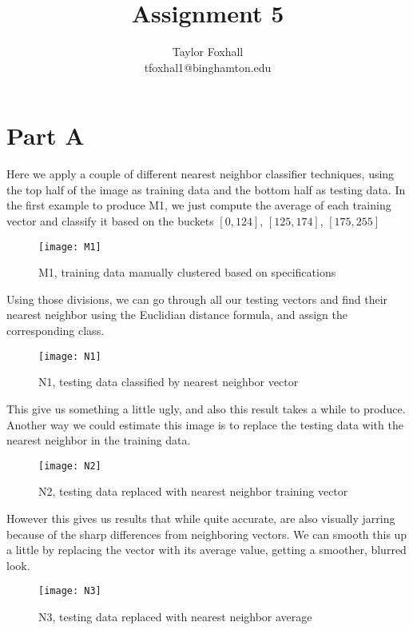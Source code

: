 \documentclass[12pt]{article}
\begin{document}
 
\title{Assignment 5}
\author{Taylor Foxhall\\
tfoxhal1@binghamton.edu}
 
\maketitle

\section{Part A}

Here we apply a couple of different nearest neighbor classifier techniques,
using the top half of the image as training data and the bottom half as testing
data. In the first example to produce M1, we just compute the average of each
training vector and classify it based on the buckets $[0, 124]$, $[125, 174]$, $[175, 255]$

\begin{figure}[H]
  \centering
  \texttt{[image: M1]}
  \caption{M1, training data manually clustered based on specifications}
\end{figure}

Using those divisions, we can go through all our testing vectors and find their
nearest neighbor using the Euclidian distance formula, and assign the
corresponding class.

\begin{figure}[H]
  \centering
  \texttt{[image: N1]}
  \caption{N1, testing data classified by nearest neighbor vector}
\end{figure}

This give us something a little ugly, and also this result takes a while to
produce. Another way we could estimate this image is to replace the testing data
with the nearest neighbor in the training data.

\begin{figure}[H]
  \centering
  \texttt{[image: N2]}
  \caption{N2, testing data replaced with nearest neighbor training vector}
\end{figure}

However this gives us results that while quite accurate, are also visually
jarring because of the sharp differences from neighboring vectors. We can smooth
this up a little by replacing the vector with its average value, getting a
smoother, blurred look.

\begin{figure}[H]
  \centering
  \texttt{[image: N3]}
  \caption{N3, testing data replaced with nearest neighbor average}
\end{figure}
\end{document}
